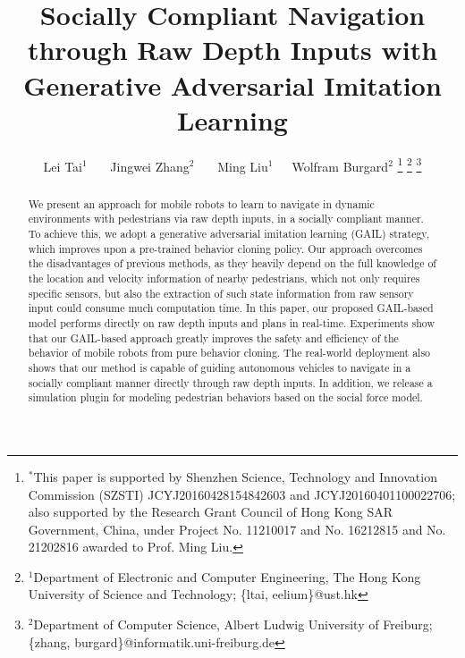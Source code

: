 \documentclass[letterpaper, 10 pt, conference]{ieeeconf}  %
\title{\LARGE \bf
    Socially Compliant Navigation through Raw Depth Inputs with Generative Adversarial Imitation Learning
}
\author{Lei Tai$^{1}$ \ \ \
Jingwei Zhang$^{2}$ \ \ \
Ming Liu$^{1}$\ \ \
Wolfram Burgard$^{2}$%
\thanks{$^{*}$This paper is supported by Shenzhen Science, Technology and Innovation Commission (SZSTI) JCYJ20160428154842603 and JCYJ20160401100022706; also supported by the Research Grant Council of Hong Kong SAR Government, China, under Project No. 11210017 and No. 16212815 and No. 21202816 awarded to Prof. Ming Liu.}
\thanks{$^{1}$Department of Electronic and Computer Engineering, The Hong Kong University of Science and Technology; \{ltai, eelium\}@ust.hk }
\thanks{$^{2}$Department of Computer Science, Albert Ludwig University of Freiburg; \{zhang, burgard\}@informatik.uni-freiburg.de }
}
\begin{document}
\maketitle
\thispagestyle{empty}
\pagestyle{empty}


\begin{abstract}
We present an approach for mobile robots to learn to navigate in dynamic environments with pedestrians via raw depth inputs,
in a socially compliant manner.
To achieve this, we adopt a generative adversarial imitation learning (GAIL) strategy, %
which improves upon a pre-trained behavior cloning policy.
Our approach overcomes the disadvantages of previous methods,
as they heavily depend on the full knowledge of the location and velocity information of nearby pedestrians,
which not only requires specific sensors,
but also the extraction of such state information from raw sensory input could consume much computation time. %
In this paper, our proposed GAIL-based model performs directly on raw depth inputs and plans in real-time.
Experiments show that our GAIL-based approach greatly improves the safety and efficiency of the behavior of mobile robots from pure behavior cloning. %
The real-world deployment also shows that our method is capable of guiding autonomous vehicles to navigate in a socially compliant manner directly through raw depth inputs.
In addition, we release a simulation plugin for modeling pedestrian behaviors  based on the social force model.


\end{abstract}
\end{document}
